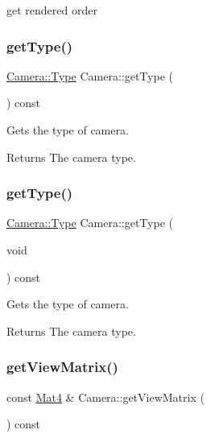 get rendered order \mbox{\label{classCamera_ae8f514578aa54023476ad541b167a1e0}} 
\subsubsection{\texorpdfstring{get\+Type()}{getType()}\hspace{0.1cm}{\footnotesize\ttfamily [1/2]}}
{\footnotesize\ttfamily \hyperlink{classCamera_a3b0a1f58deca679ac665f61c480d1dcb}{Camera\+::\+Type} Camera\+::get\+Type (\begin{DoxyParamCaption}{ }\end{DoxyParamCaption}) const\hspace{0.3cm}{\ttfamily [inline]}}

Gets the type of camera.

\begin{DoxyReturn}{Returns}
The camera type. 
\end{DoxyReturn}
\mbox{\label{classCamera_ae8f514578aa54023476ad541b167a1e0}} 
\subsubsection{\texorpdfstring{get\+Type()}{getType()}\hspace{0.1cm}{\footnotesize\ttfamily [2/2]}}
{\footnotesize\ttfamily \hyperlink{classCamera_a3b0a1f58deca679ac665f61c480d1dcb}{Camera\+::\+Type} Camera\+::get\+Type (\begin{DoxyParamCaption}\item[{void}]{ }\end{DoxyParamCaption}) const\hspace{0.3cm}{\ttfamily [inline]}}

Gets the type of camera.

\begin{DoxyReturn}{Returns}
The camera type. 
\end{DoxyReturn}
\mbox{\label{classCamera_ab30a2ac464fe2d653e99502f07325887}} 
\subsubsection{\texorpdfstring{get\+View\+Matrix()}{getViewMatrix()}\hspace{0.1cm}{\footnotesize\ttfamily [1/2]}}
{\footnotesize\ttfamily const \hyperlink{classMat4}{Mat4} \& Camera\+::get\+View\+Matrix (\begin{DoxyParamCaption}{ }\end{DoxyParamCaption}) const}

